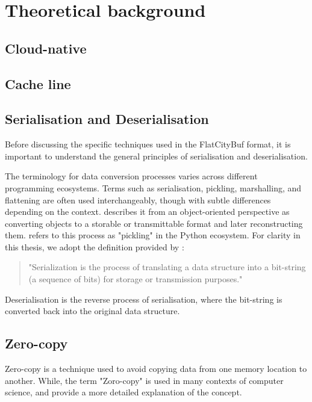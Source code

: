 \chapter{Theoretical background}
\label{chap:theoretical_background}

\section{Cloud-native}
\label{tb:cloud_native}

\section{Cache line}
\label{tb:cache_line}


\section{Serialisation and Deserialisation}
\label{tb:serialisation_deserialisation}
Before discussing the specific techniques used in the FlatCityBuf format, it is important to understand the general principles of serialisation and deserialisation.

The terminology for data conversion processes varies across different programming ecosystems. Terms such as serialisation, pickling, marshalling, and flattening are often used interchangeably, though with subtle differences depending on the context. \citet{cpp_serialization} describes it from an object-oriented perspective as converting objects to a storable or transmittable format and later reconstructing them. \citet{py_serialization} refers to this process as "pickling" in the Python ecosystem. For clarity in this thesis, we adopt the definition provided by \citet{viotti_2022}:

\begin{quote}
  "Serialization is the process of translating a data structure into a bit-string (a sequence of bits) for storage or transmission purposes."
\end{quote}

Deserialisation is the reverse process of serialisation, where the bit-string is converted back into the original data structure.

\section{Zero-copy}
\label{tb:zero_copy}
Zero-copy is a technique used to avoid copying data from one memory location to another. While, the term "Zoro-copy" is used in many contexts of computer science, \citet{song2012performance}  and \citet{brose_2008_zerocopy} provide a more detailed explanation of the concept.

